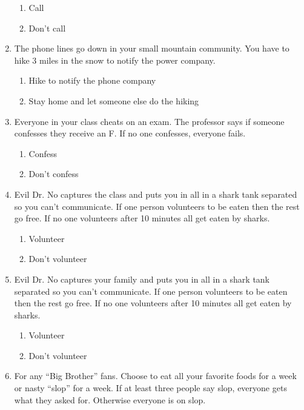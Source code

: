 \begin{enumerate}
\begin{enumerate}
\item Call
\item Don't call
\end{enumerate}

\item The phone lines go down in your small mountain community. You have to hike 3 miles in the snow to notify the power company.

\begin{enumerate}
\item Hike to notify the phone company
\item Stay home and let someone else do the hiking
\end{enumerate}

\item Everyone in your class cheats on an exam. The professor says if someone confesses they receive an F. If no one confesses, everyone fails.

\begin{enumerate}
\item Confess
\item Don't confess
\end{enumerate}

\item Evil Dr. No captures the class and puts you in all in a shark tank separated so you can't communicate. If one person volunteers to be eaten then the rest go free. If no one volunteers after 10 minutes all get eaten by sharks.

\begin{enumerate}
\item Volunteer
\item Don't volunteer
\end{enumerate}

\item Evil Dr. No captures your family and puts you in all in a shark tank separated so you can't communicate. If one person volunteers to be eaten then the rest go free. If no one volunteers after 10 minutes all get eaten by sharks.

\begin{enumerate}
\item Volunteer
\item Don't volunteer
\end{enumerate}

\item For any ``Big Brother'' fans. Choose to eat all your favorite foods for a week or nasty ``slop'' for a week. If at least three people say slop, everyone gets what they asked for. Otherwise everyone is on slop.


\end{enumerate}
